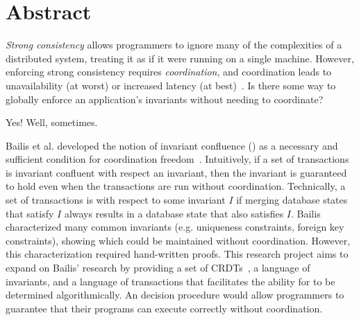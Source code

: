 \section{Abstract}
\emph{Strong consistency} allows programmers to ignore many of the complexities
of a distributed system, treating it as if it were running on a single machine.
However, enforcing strong consistency requires \emph{coordination}, and
coordination leads to unavailability (at worst) or
increased latency (at best)~\cite{gilbert2002brewer, abadi2012consistency}. Is
there some way to globally enforce an application's invariants without needing
to coordinate?

Yes! Well, sometimes.

Bailis et al. developed the notion of invariant confluence (\iconfluence{}) as
a necessary and sufficient condition for coordination
freedom~\cite{bailis2014coordination}. Intuitively, if a set of transactions is
invariant confluent with respect an invariant, then the invariant is guaranteed
to hold even when the transactions are run without coordination.  Technically,
a set of transactions is \iconfluent{} with respect to some invariant $I$ if
merging database states that satisfy $I$ always results in a database state
that also satisfies $I$.  Bailis characterized many common invariants (e.g.
uniqueness constraints, foreign key constraints), showing which could be
maintained without coordination. However, this characterization required
hand-written proofs. This research project aims to expand on Bailis' research
by providing a set of CRDTs~\cite{shapiro2011comprehensive,
shapiro2011conflict}, a language of invariants, and a language of transactions
that facilitates the ability for \iconfluence{} to be determined
algorithmically. An \iconfluence{} decision procedure would allow programmers
to guarantee that their programs can execute correctly without coordination.
